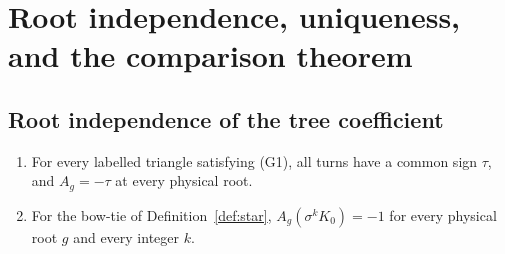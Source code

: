 \section{Root independence, uniqueness, and the comparison theorem}\label{sec:comparison}

\subsection{Root independence of the tree coefficient}

\begin{lemma}\label{lem:A-small-values}
\begin{enumerate}
\item[(i)] For every labelled triangle satisfying (G1), all turns
have a common sign $\tau$, and $A_g=-\tau$ at every physical root.
\item[(ii)] For the bow-tie of Definition~\ref{def:star},
$A_g(\sigma^kK_0)=-1$ for every physical root $g$ and every integer $k$.
\end{enumerate}
\end{lemma}
